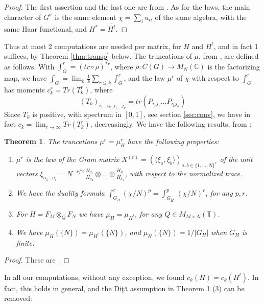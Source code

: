 \documentclass[11pt]{amsart}
\newtheorem{theorem}{Theorem}[section]
\newcommand{\T}{\mathbb T}
\begin{document}
\begin{proof}
The first assertion and the last one are from \cite[Proposition 2.2, Theorem 2.3]{ba5}. As for the laws, the main character of $G^\sigma$ is the same element $\chi=\sum_iu_{ii}$ of the same algebra, with the same Haar functional, and $H^*=\overline{H^t}$.
\end{proof}

Thus at most 2 computations are needed per matrix, for $H$ and $H^t$, and in fact 1 suffices, by Theorem \ref{thm:transp} below. The truncations of $\mu$, from \cite{ba5}, are defined as follows. With $\int_G^r=(tr\circ\rho)^{*r}$, where $\rho:C(G)\to M_N(\mathbb C)$ is the factorizing map, we have $\int_G=\lim_k\frac{1}{k}\sum_{r\leq k}\int_G^r$, and the law $\mu^r$ of $\chi$ with respect to $\int_G^r$ has moments $c_k^r=Tr(T_k^r)$, where
$$(T_k)_{i_1\ldots i_k,j_1\ldots j_k}=tr(P_{i_1j_1}\ldots P_{i_kj_k})$$
Since $T_k$ is positive, with spectrum in $[0,1]$, see section \ref{sec:conv}, we have in fact $c_k=\lim_{r\to\infty}Tr(T_k^r)$, decreasingly. We have the following results, from \cite{ba5}:

\begin{theorem}\label{thm:trunc}
The truncations $\mu^r=\mu^r_H$ have the following properties:
\begin{enumerate}
\item $\mu^r$ is the law of the Gram matrix $X^{(r)}=(\langle\xi_a,\xi_b\rangle)_{a,b\in\{1,\ldots,N\}^r}$ of the unit vectors $\xi_{a_1\ldots a_r}=N^{-r/2}\,\frac{H_{a_1}}{H_{a_2}}\otimes\ldots\otimes\frac{H_{a_r}}{H_{a_1}}$, with respect to the normalized trace.

\item We have the duality formula $\int_{G_H}^r(\chi/N)^p=\int_{G_{H^t}}^p(\chi/N)^r$, for any $p,r$.

\item For $H=F_M\otimes_QF_N$ we have $\mu_H=\mu_{H^t}$, for any $Q\in M_{M\times N}(\T)$.

\item We have $\mu_H(\{N\})=\mu_{H^t}(\{N\})$, and $\mu_H(\{N\})=1/|G_H|$ when $G_H$ is finite.
\end{enumerate}
\end{theorem}

\begin{proof}
These are \cite[Theorem 4.4, Theorem 5.2, Propositions 4.1, 4.5, 4.6]{ba5}.
\end{proof}

In all our computations, without any exception, we found $c_k(H)=c_k(H^t)$. In fact, this holds in general, and the Di\c t\u a assumption in Theorem \ref{thm:trunc} (3) can be removed:
\end{document}
